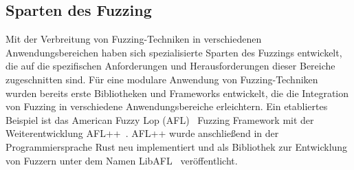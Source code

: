 \subsection{Sparten des Fuzzing}\label{subsec:sparten-des-fuzzing}
Mit der Verbreitung von Fuzzing-Techniken in verschiedenen Anwendungsbereichen haben sich spezialisierte Sparten des Fuzzings
entwickelt, die auf die spezifischen Anforderungen und Herausforderungen dieser Bereiche zugeschnitten sind.
Für eine modulare Anwendung von Fuzzing-Techniken wurden bereits erste Bibliotheken und Frameworks entwickelt, die
die Integration von Fuzzing in verschiedene Anwendungsbereiche erleichtern.
Ein etabliertes Beispiel ist das American Fuzzy Lop (AFL)~\cite{afl} Fuzzing Framework mit der Weiterentwicklung AFL++~\cite{AFLplusplus-Woot20}.
AFL++ wurde anschließend in der Programmiersprache Rust neu implementiert und als Bibliothek zur Entwicklung von Fuzzern
unter dem Namen LibAFL~\cite{fioraldi_libafl_2022} veröffentlicht.
